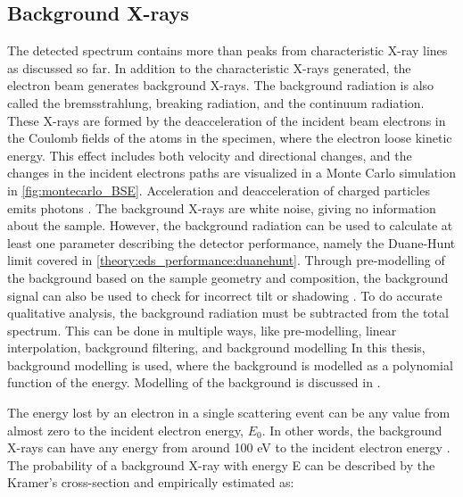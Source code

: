 \subsection{Background X-rays}
\label{theory:xray_formation:background}


The detected spectrum contains more than peaks from characteristic X-ray lines as discussed so far.
In addition to the characteristic X-rays generated, the electron beam generates background X-rays.
The background radiation is also called the bremsstrahlung, breaking radiation, and the continuum radiation.
These X-rays are formed by the deacceleration of the incident beam electrons in the Coulomb fields of the atoms in the specimen, where the electron loose kinetic energy.
This effect includes both velocity and directional changes, and the changes in the incident electrons paths are visualized in a Monte Carlo simulation in \cref{fig:montecarlo_BSE}.
Acceleration and deacceleration of charged particles emits photons \cite{notaros_electromagnetics_2010}.
The background X-rays are white noise, giving no information about the sample.
However, the background radiation can be used to calculate at least one parameter describing the detector performance, namely the Duane-Hunt limit covered in \cref{theory:eds_performance:duanehunt}.
Through pre-modelling of the background based on the sample geometry and composition, the background signal can also be used to check for incorrect tilt or shadowing \cite{edax_insight_2019}.
To do accurate qualitative analysis, the background radiation must be subtracted from the total spectrum.
This can be done in multiple ways, like pre-modelling, linear interpolation, background filtering, and background modelling \cite{liao2006practical}
In this thesis, background modelling is used, where the background is modelled as a polynomial function of the energy.
Modelling of the background is discussed in .


The energy lost by an electron in a single scattering event can be any value from almost zero to the incident electron energy, $E_0$.
In other words, the background X-rays can have any energy from around 100 eV to the incident electron energy \cite[Ch. 4.3]{goldstein_scanning_2018}.
The probability of a background X-ray with energy E can be described by the Kramer's cross-section and empirically estimated as:

